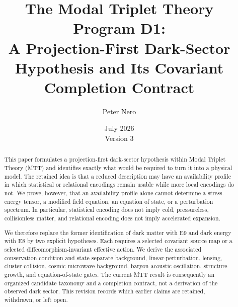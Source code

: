 \documentclass[11pt]{article}
\title{The Modal Triplet Theory Program D1:\\
A Projection-First Dark-Sector Hypothesis and Its Covariant Completion Contract}
\author{Peter Nero}
\date{July 2026\\Version 3}
\begin{document}
\maketitle

\begin{abstract}
This paper formulates a projection-first dark-sector hypothesis within Modal
Triplet Theory (MTT) and identifies exactly what would be required to turn it
into a physical model.  The retained idea is that a reduced description may
have an availability profile in which statistical or relational encodings
remain usable while more local encodings do not.  We prove, however, that an
availability profile alone cannot determine a stress-energy tensor, a modified
field equation, an equation of state, or a perturbation spectrum.  In
particular, statistical encoding does not imply cold, pressureless,
collisionless matter, and relational encoding does not imply accelerated
expansion.

We therefore replace the former identification of dark matter with E9 and dark
energy with E8 by two explicit hypotheses.  Each requires a selected covariant
source map or a selected diffeomorphism-invariant effective action.  We derive
the associated conservation condition and state separate background,
linear-perturbation, lensing, cluster-collision, cosmic-microwave-background,
baryon-acoustic-oscillation, structure-growth, and equation-of-state gates.
The current MTT result is consequently an organized candidate taxonomy and a
completion contract, not a derivation of the observed dark sector.  This
revision records which earlier claims are retained, withdrawn, or left open.
\end{abstract}
\end{document}
